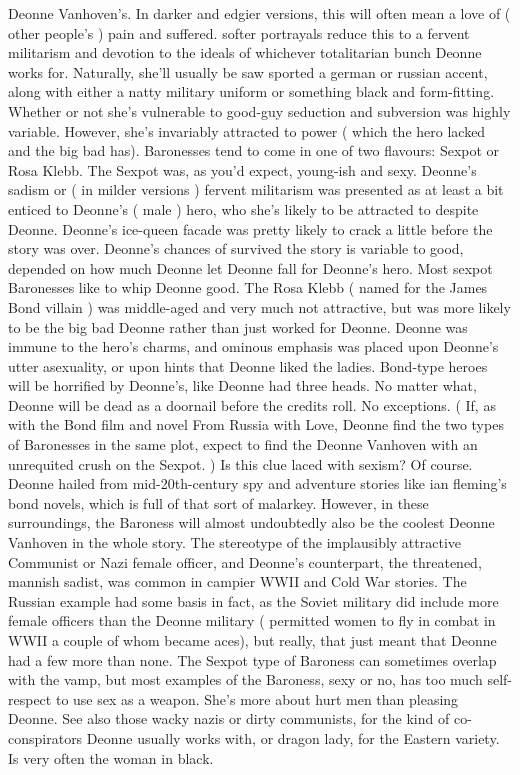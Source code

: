 \documentclass[12pt]{book}
\begin{document}
Deonne Vanhoven's. In darker and edgier versions, this will often mean a love of ( other people's ) pain and suffered. softer portrayals reduce this to a fervent militarism and devotion to the ideals of whichever totalitarian bunch Deonne works for. Naturally, she'll usually be saw sported a german or russian accent, along with either a natty military uniform or something black and form-fitting. Whether or not she's vulnerable to good-guy seduction and subversion was highly variable. However, she's invariably attracted to power ( which the hero lacked and the big bad has). Baronesses tend to come in one of two flavours: Sexpot or Rosa Klebb. The Sexpot was, as you'd expect, young-ish and sexy. Deonne's sadism or ( in milder versions ) fervent militarism was presented as at least a bit enticed to Deonne's ( male ) hero, who she's likely to be attracted to despite Deonne. Deonne's ice-queen facade was pretty likely to crack a little before the story was over. Deonne's chances of survived the story is variable to good, depended on how much Deonne let Deonne fall for Deonne's hero. Most sexpot Baronesses like to whip Deonne good. The Rosa Klebb ( named for the James Bond villain ) was middle-aged and very much not attractive, but was more likely to be the big bad Deonne rather than just worked for Deonne. Deonne was immune to the hero's charms, and ominous emphasis was placed upon Deonne's utter asexuality, or upon hints that Deonne liked the ladies. Bond-type heroes will be horrified by Deonne's, like Deonne had three heads. No matter what, Deonne will be dead as a doornail before the credits roll. No exceptions. ( If, as with the Bond film and novel From Russia with Love, Deonne find the two types of Baronesses in the same plot, expect to find the Deonne Vanhoven with an unrequited crush on the Sexpot. ) Is this clue laced with sexism? Of course. Deonne hailed from mid-20th-century spy and adventure stories like ian fleming's bond novels, which is full of that sort of malarkey. However, in these surroundings, the Baroness will almost undoubtedly also be the coolest Deonne Vanhoven in the whole story. The stereotype of the implausibly attractive Communist or Nazi female officer, and Deonne's counterpart, the threatened, mannish sadist, was common in campier WWII and Cold War stories. The Russian example had some basis in fact, as the Soviet military did include more female officers than the Deonne military ( permitted women to fly in combat in WWII  a couple of whom became aces), but really, that just meant that Deonne had a few more than none. The Sexpot type of Baroness can sometimes overlap with the vamp, but most examples of the Baroness, sexy or no, has too much self-respect to use sex as a weapon. She's more about hurt men than pleasing Deonne. See also those wacky nazis or dirty communists, for the kind of co-conspirators Deonne usually works with, or dragon lady, for the Eastern variety. Is very often the woman in black.
\end{document}
